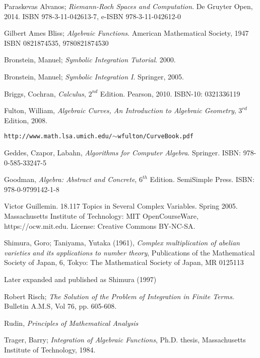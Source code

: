 

\begin{thebibliography}{9}

Paraskevas Alvanos;
{\it Riemann-Roch Spaces and Computation}.
De Gruyter Open, 2014.
ISBN 978-3-11-042613-7, e-ISBN 978-3-11-042612-0

Gilbert Ames Bliss; {\it Algebraic Functions}. American Mathematical Society, 1947
ISBN 0821874535, 9780821874530

Bronstein, Manuel; {\it Symbolic Integration Tutorial}. 2000.

Bronstein, Manuel; {\it Symbolic Integration I}. Springer, 2005.

Briggs, Cochran, {\it Calculus}, $2^{nd}$ Edition.  Pearson, 2010.  ISBN-10: 0321336119

Fulton, William, {\it Algebraic Curves, An Introduction to Algebraic Geometry}, $3^{rd}$ Edition, 2008.

{\tt http://www.math.lsa.umich.edu/$\sim$wfulton/CurveBook.pdf}

Geddes, Czapor, Labahn, {\it Algorithms for Computer Algebra}. Springer.
ISBN: 978-0-585-33247-5

Goodman, {\it Algebra: Abstract and Concrete}, $6^{th}$ Edition.  SemiSimple Press.
ISBN: 978-0-9799142-1-8

Victor Guillemin. 18.117 Topics in Several Complex Variables. Spring 2005. Massachusetts Institute of Technology: MIT OpenCourseWare, https://ocw.mit.edu. License: Creative Commons BY-NC-SA.

Shimura, Goro; Taniyama, Yutaka (1961), {\it Complex multiplication of abelian varieties and its applications to number theory},
Publications of the Mathematical Society of Japan, 6, Tokyo: The Mathematical Society of Japan, MR 0125113

Later expanded and published as Shimura (1997)

Robert Risch; {\it The Solution of the Problem of Integration in Finite Terms}.  Bulletin A.M.S, Vol 76, pp. 605-608.

Rudin, {\it Principles of Mathematical Analysis}

Trager, Barry; {\it Integration of Algebraic Functions}, Ph.D. thesis, Massachusetts Institute of Technology, 1984.

\end{thebibliography}
